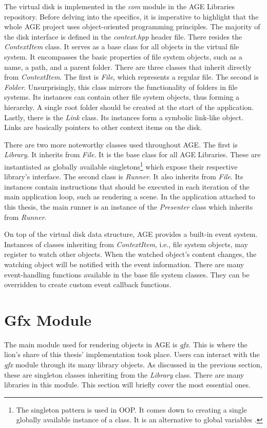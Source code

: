 \documentclass[
  digital,     %
  oneside,     %
  nosansbold,  %
  nocolorbold, %
  lof,         %
  lot,         %
]{fithesis4}
\begin{document}
The virtual disk is implemented in the \textit{com} module in the AGE Libraries repository.
Before delving into the specifics, it is imperative to highlight that the whole AGE project
uses object-oriented programming principles. The majority
of the disk interface is defined in the \textit{context.hpp} header file. There resides the \textit{ContextItem}
class. It serves as a base class for all objects in the virtual file system. It encompasses the basic
properties of file system objects, such as a name, a path, and a parent folder. There are three classes
that inherit directly from \textit{ContextItem}. The first is \textit{File}, which represents a regular
file. The second is \textit{Folder}. Unsurprisingly, this class mirrors the functionality of folders
in file systems. Its instances can contain other file system objects, thus forming a hierarchy.
A single root folder should be created at the start of the application. Lastly, there is the \textit{Link}
class. Its instances form a symbolic link-like object. Links are basically pointers to other context items
on the disk.

There are two more noteworthy classes used throughout AGE. The first is \textit{Library}. It inherits from
\textit{File}. It is the base class for all AGE Libraries. These are instantiated as globally available
singletons\footnote{The singleton pattern is used in OOP. It comes down to creating a single globally
available instance of a class. It is an alternative to global variables \cite{singleton}.}
which expose their respective library's interface. The second class is \textit{Runner}. It also
inherits from \textit{File}. Its instances contain instructions that should be executed
in each iteration of the main application loop, such as rendering a scene. In the application
attached to this thesis, the main runner is an instance of the \textit{Presenter} class
which inherits from \textit{Runner}.

On top of the virtual disk data structure, AGE provides a built-in event system.
Instances of classes inheriting from \textit{ContextItem}, i.e., file system objects,
may register to watch other objects. When the watched object's content changes, the
watching object will be notified with the event information. There are many event-handling
functions available in the base file system classes. They can be overridden
to create custom event callback functions.

\section{Gfx Module}
The main module used for rendering objects in AGE is \textit{gfx}.
This is where the lion's share of this thesis' implementation took place. Users can interact with the
\textit{gfx} module through its many library objects. As discussed in the previous section,
these are singleton classes inheriting from the \textit{Library} class. There are many
libraries in this module. This section will briefly cover the most essential ones.
\end{document}

